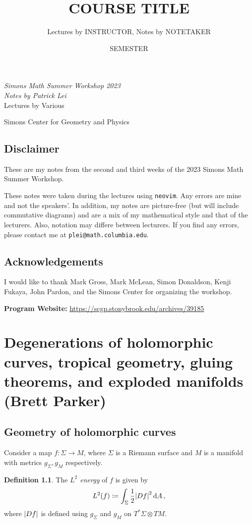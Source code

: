 \documentclass[leqno, openany]{memoir}
\title{COURSE TITLE}
\author{Lectures by INSTRUCTOR, Notes by NOTETAKER}
\date{SEMESTER}
\theoremstyle{definition}
\newtheorem{defn}[thm]{Definition}
\theoremstyle{remark}
\theoremstyle{plain}
\theoremstyle{definition}
\theoremstyle{remark}
\newcommand*{\titleSW}
    {\begingroup%
    \raggedleft
    \vspace*{\baselineskip}
    {\Huge\itshape Simons Math Summer Workshop 2023}\\[\baselineskip]
    {\large\itshape Notes by Patrick Lei}\\[0.2\textheight]
    {\Large Lectures by Various}\par
    \vfill
    {\Large \sffamily Simons Center for Geometry and Physics}
    \vspace*{\baselineskip}
\endgroup}
\begin{document}
    
\begin{titlingpage}
\titleSW
\end{titlingpage}

\thispagestyle{empty}
\section*{Disclaimer}%
\label{sec:disclaimer}

These are my notes from the second and third weeks of the 2023 Simons Math Summer Workshop.

These notes were taken during the lectures using \texttt{neovim}. 
Any errors are mine and not the speakers'. 
In addition, my notes are picture-free (but will include commutative diagrams) and are a mix of my mathematical style and that of the lecturers. Also, notation may differe between lecturers.
If you find any errors, please contact me at \texttt{plei@math.columbia.edu}.

\section*{Acknowledgements}

I would like to thank Mark Gross, Mark McLean, Simon Donaldson, Kenji Fukaya, John Pardon, and the Simons Center for organizing the workshop.

\vspace*{1cm}

\noindent\textbf{Program Website:}  \url{https://scgp.stonybrook.edu/archives/39185}
\newpage

\tableofcontents

\chapter{Degenerations of holomorphic curves, tropical geometry, gluing theorems, and exploded manifolds (Brett Parker)}%
\label{cha:degenerations}

\section{Geometry of holomorphic curves}

Consider a map $f \colon \Sigma \to M$, where $\Sigma$ is a Riemann surface and $M$ is a manifold with metrics $g_{\Sigma}, g_M$ respectively.

\begin{defn}
    The \textit{$L^2$ energy} of $f$ is given by
    \[ L^2(f) \coloneqq \int_{\Sigma} \frac{1}{2} \abs{Df}^2 \dd{A}, \]
    where $\abs{Df}$ is defined using $g_{\Sigma}$ and $g_M$ on $T^*\Sigma \otimes TM$.
\end{defn}
\end{document}
